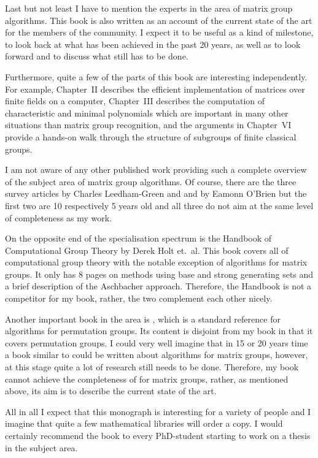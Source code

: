 \documentclass[11pt]{article}
\begin{document}
Last but not least I have to mention the experts in the area of
matrix group algorithms.
This book is also written as an account of the current
state of the art for the members of the community.
I expect it to be useful as a kind of milestone, to look back at what has
been achieved in the past 20 years, as well as to look forward and to
discuss what still has to be done.

Furthermore, quite a few of the parts of this book are interesting
independently. For example, Chapter~II describes the efficient implementation 
of matrices over finite fields on a computer, Chapter~III describes
the computation of characteristic and minimal polynomials which
are important in many other situations than matrix group recognition, 
and the arguments in Chapter~VI provide a hands-on walk through the
structure of subgroups of finite classical groups.

I am not aware of any other published work providing such a complete
overview of the subject area of matrix group algorithms. 
Of course, there are the three survey
articles \cite{CLG} by Charles Leedham-Green and \cite{EOB} and
\cite{EOBBath}
by Eamonn O'Brien but the
first two are 10 respectively 5 years old and all three do not aim 
at the same level of completeness as my work.

On the opposite end of the specialisation spectrum is the Handbook of
Computational Group Theory \cite{handbook} by Derek Holt et.~al.
This book covers all of computational group theory with the notable 
exception of algorithms for matrix groups. It only has 8 pages on
methods using base and strong generating sets and a brief description
of the Aschbacher approach. Therefore, the Handbook
is not a competitor for my book, rather, the two complement each other
nicely.

Another important book in the area is \cite{akosperm}, which is a
standard reference for algorithms for permutation groups. Its content 
is disjoint from my book in that it covers permutation groups. I could
very well imagine that in 15 or 20 years time a book similar to
\cite{akosperm} could be written about algorithms for matrix groups,
however, at this stage quite a lot of research still needs to be done.
Therefore, my book cannot achieve the completeness of \cite{akosperm}
for matrix groups,
rather, as mentioned above, its aim is to describe the current state
of the art.

All in all I expect that this monograph is interesting for a
variety of people and I imagine that quite a few mathematical
libraries will order a copy. I would certainly recommend the book
to every PhD-student starting to work on a thesis in the subject area.
\end{document}
